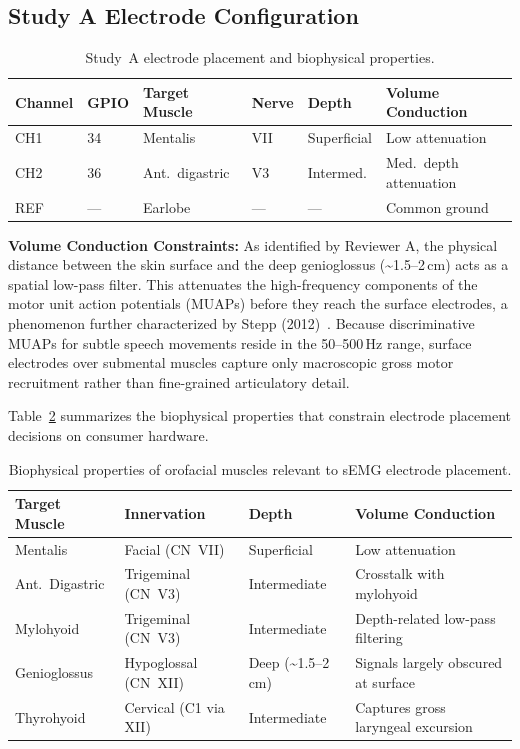 \documentclass{article}
\begin{document}
\subsection{Study A Electrode Configuration}

\begin{table}[ht]
\centering
\caption{Study~A electrode placement and biophysical properties.}
\label{tab:electrodes}
\begin{tabular}{@{}llllll@{}}
\toprule
Channel & GPIO & Target Muscle & Nerve & Depth & Volume Conduction \\
\midrule
CH1 & 34 & Mentalis & VII & Superficial & Low attenuation \\
CH2 & 36 & Ant.\ digastric & V3 & Intermed. & Med.\ depth attenuation \\
REF & --- & Earlobe & --- & --- & Common ground \\
\bottomrule
\end{tabular}
\end{table}

\textbf{Volume Conduction Constraints:} As identified by Reviewer A, the physical distance between the skin surface and the deep genioglossus (\textasciitilde1.5--2\,cm) acts as a spatial low-pass filter. This attenuates the high-frequency components of the motor unit action potentials (MUAPs) before they reach the surface electrodes, a phenomenon further characterized by Stepp (2012)~\cite{stepp2012}. Because discriminative MUAPs for subtle speech movements reside in the 50--500\,Hz range, surface electrodes over submental muscles capture only macroscopic gross motor recruitment rather than fine-grained articulatory detail.

Table~\ref{tab:innervation} summarizes the biophysical properties that constrain electrode placement decisions on consumer hardware.

\begin{table}[ht]
\centering
\caption{Biophysical properties of orofacial muscles relevant to sEMG electrode placement.}
\label{tab:innervation}
\begin{tabular}{@{}llll@{}}
\toprule
Target Muscle & Innervation & Depth & Volume Conduction \\
\midrule
Mentalis & Facial (CN~VII) & Superficial & Low attenuation \\
Ant.\ Digastric & Trigeminal (CN~V3) & Intermediate & Crosstalk with mylohyoid \\
Mylohyoid & Trigeminal (CN~V3) & Intermediate & Depth-related low-pass filtering \\
Genioglossus & Hypoglossal (CN~XII) & Deep (\textasciitilde1.5--2\,cm) & Signals largely obscured at surface \\
Thyrohyoid & Cervical (C1 via XII) & Intermediate & Captures gross laryngeal excursion \\
\bottomrule
\end{tabular}
\end{table}
\end{document}
